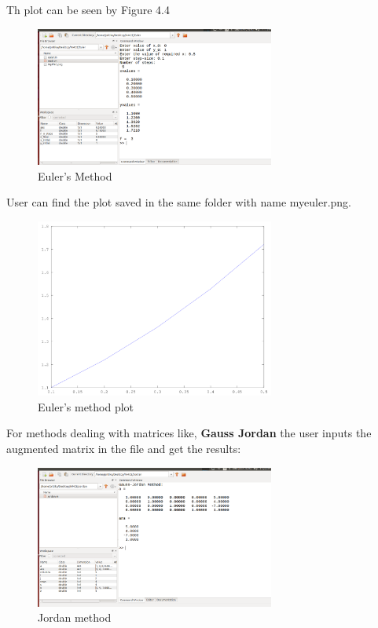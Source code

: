 Th plot can be seen by Figure 4.4\\
\begin{figure}[!ht]
	\centering
	\includegraphics[width=0.7\textwidth]{images/euler.png}                
	\caption{Euler's Method}
	\hspace{-1.5em}
\end{figure}
User can find the plot saved in the same folder with name myeuler.png.
\begin{figure}[!ht]
	\centering
	\includegraphics[width=0.7\textwidth]{images/myeuler.png}                
	\caption{Euler's method plot }
	\hspace{-1.5em}
\end{figure}
\newpage
 For methods dealing with matrices like,
 \textbf{Gauss Jordan}
 the user inputs the augmented matrix in the file and get the results:\\
 \begin{figure}[!ht]
 	\centering
 	\includegraphics[width=0.7\textwidth]{images/jordan.png}                
 	\caption{Jordan method }
 	\hspace{-1.5em}
 \end{figure}
